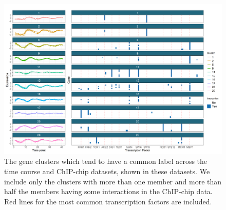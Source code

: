 \documentclass{bmcart}
\begin{document}

\begin{figure}
    \centering
    \includegraphics[scale=0.62]{./SupplementaryMaterial/Images/Yeast/timecourseChIPchipFused.png}
    \caption{The gene clusters which tend to have a common label across the time course and ChIP-chip datasets, shown in these datasets. We include only the clusters with more than one member and more than half the members having some interactions in the ChIP-chip data. Red lines for the most common transcription factors are included.}
    \label{fig:timepointChIPchipFused}
\end{figure}
\end{document}
